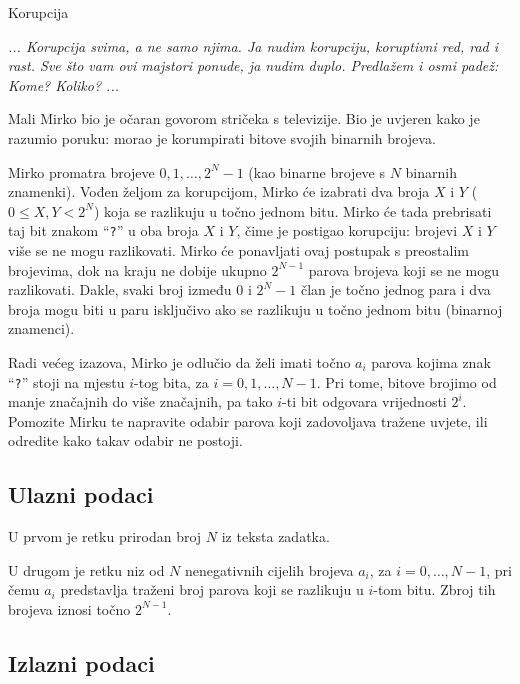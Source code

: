 \begin{statement}[
  problempoints=100,
  timelimit=1 sekunda,
  memorylimit= 512 MiB,
]{Korupcija}

\textit{... Korupcija svima, a ne samo njima. Ja nudim korupciju, koruptivni red, rad i rast. 
Sve što vam ovi majstori ponude, ja nudim duplo. 
Predlažem i osmi padež: Kome? Koliko? ...}

Mali Mirko bio je očaran govorom stričeka s televizije. 
Bio je uvjeren kako je razumio poruku: morao je korumpirati bitove svojih binarnih brojeva. 

Mirko promatra brojeve $0, 1, \dots, 2^N-1$ (kao binarne brojeve s $N$ binarnih znamenki). 
Vođen željom za korupcijom, Mirko će izabrati dva broja $X$ i $Y$ ($0 \leq X, Y < 2^N$) 
koja se razlikuju u točno jednom bitu. Mirko će tada prebrisati 
taj bit znakom “\texttt{?}” u oba broja $X$ i $Y$, 
čime je postigao korupciju: brojevi $X$ i $Y$ više se ne mogu razlikovati. 
Mirko će ponavljati ovaj postupak s preostalim brojevima, dok na kraju ne dobije 
ukupno $2^{N-1}$ parova brojeva koji se ne mogu razlikovati. 
Dakle, svaki broj između $0$ i $2^N - 1$ član je točno jednog para i 
dva broja mogu biti u paru isključivo ako se razlikuju u točno jednom bitu (binarnoj znamenci). 

Radi većeg izazova, Mirko je odlučio da želi imati točno $a_i$ parova 
kojima znak “\texttt{?}” stoji na mjestu $i$-tog bita, za $i = 0, 1, \dots, N-1$. 
Pri tome, bitove brojimo od manje značajnih do više značajnih, pa tako $i$-ti bit 
odgovara vrijednosti $2^i$. 
Pomozite Mirku te napravite odabir parova koji zadovoljava tražene uvjete, ili 
odredite kako takav odabir ne postoji. 

\subsection*{Ulazni podaci}

U prvom je retku prirodan broj $N$ iz teksta zadatka. 

U drugom je retku niz od $N$ nenegativnih cijelih brojeva $a_i$, za $i = 0, \dots, N-1$, 
pri čemu $a_i$ predstavlja traženi broj parova koji se razlikuju u $i$-tom bitu. 
Zbroj tih brojeva iznosi točno $2^{N-1}$. 

\subsection*{Izlazni podaci}


\end{statement}
